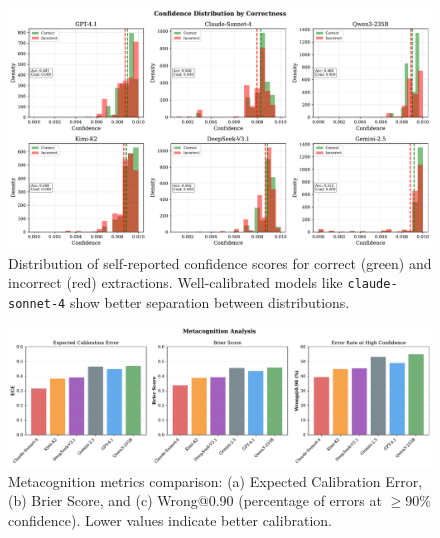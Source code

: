 \begin{figure}[htbp]
  \centering
  \includegraphics[width=\linewidth]{fig_confidence_distribution.pdf}
  \caption{Distribution of self-reported confidence scores for correct (green) and incorrect (red) extractions. Well-calibrated models like \texttt{claude-sonnet-4} show better separation between distributions.}
  \label{fig:confidence-distribution}
\end{figure}

\begin{figure}[htbp]
  \centering
  \includegraphics[width=\linewidth]{fig_metacognition.pdf}
  \caption{Metacognition metrics comparison: (a) Expected Calibration Error, (b) Brier Score, and (c) Wrong@0.90 (percentage of errors at $\geq$90\% confidence). Lower values indicate better calibration.}
  \label{fig:metacognition}
\end{figure}


